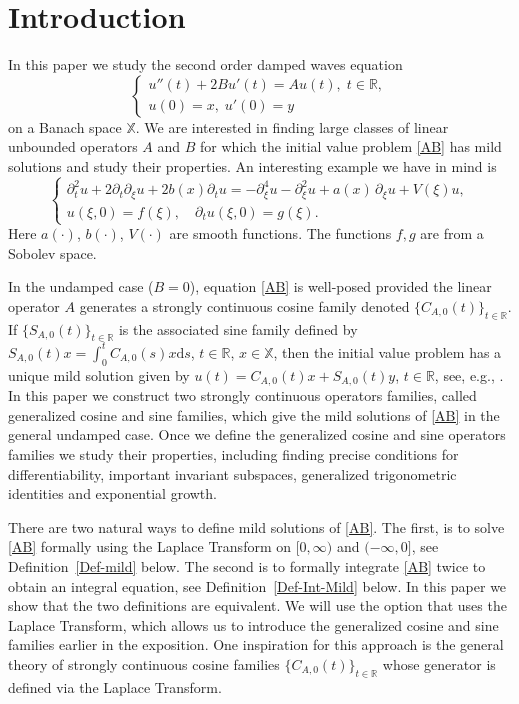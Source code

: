 \documentclass[11pt]{amsart}
\numberwithin{equation}{section}
\newcommand{\RR}{{\mathbb R}}
\newcommand{\rmd}{{\mathrm{d}}}
\theoremstyle{remark}
\theoremstyle{definition}
\newcommand\bX{{\mathbb X}}
\begin{document}
\section{Introduction }\label{s1}
In this paper we study the second order damped waves equation 
\begin{equation}\label{AB}
	\begin{cases}
		u''(t) + 2Bu'(t) = Au(t),\;t\in\RR,\\
		u(0) = x,\; u'(0) = y
	\end{cases}
\end{equation}
on a Banach space $\bX$. We are interested in finding large classes of linear unbounded operators $A$ and $B$ for which the initial value problem \eqref{AB} has mild solutions and study their properties. An interesting example we have in mind is 
\begin{equation}\label{AB-leitmotif}
	\begin{cases}
		\partial_t^2u + 2\partial_t\partial_\xi u+2b(x)\partial_tu = -\partial_\xi^{4} u-\partial_\xi^2 u + a(x)\,\partial_\xi u + V(\xi)u,\\
		u(\xi,0) = f(\xi),\quad \partial_tu(\xi,0) =g(\xi).
	\end{cases}
\end{equation}
Here $a(\cdot)$, $b(\cdot)$, $V(\cdot)$ are smooth functions. The functions $f,g$ are from a Sobolev space.

In the undamped case ($B=0$), equation \eqref{AB} is well-posed provided the linear operator $A$ generates a strongly continuous cosine family denoted $\{C_{A,0}(t)\}_{t\in\RR}$. If $\{S_{A,0}(t)\}_{t\in\RR}$ is the associated sine family defined by $S_{A,0}(t)x=\displaystyle\int_0^tC_{A,0}(s)x\rmd s$, $t\in\RR$, $x\in\bX$, then the initial value problem has a unique mild solution 
given by $u(t)=C_{A,0}(t)x+S_{A,0}(t)y$, $t\in\RR$, see, e.g., \cite[Corollary 3.14.8]{ABHN}. In this paper we construct two strongly continuous operators families, called generalized cosine and sine families, which give the mild solutions of \eqref{AB} in the general undamped case. Once we define the generalized cosine and sine operators families we study their properties, including finding precise conditions for differentiability, important invariant subspaces, generalized trigonometric identities and exponential growth.


There are two natural ways to define mild solutions of \eqref{AB}. The first, is to solve \eqref{AB} formally using the Laplace Transform on $[0,\infty)$ and $(-\infty,0]$, see Definition~\ref{Def-mild} below. The second is to formally integrate \eqref{AB} twice to obtain an integral equation, see Definition~\ref{Def-Int-Mild} below. In this paper we show that the two definitions are equivalent. We will use the option that uses the Laplace Transform, which allows us to introduce the generalized cosine and sine families earlier in the exposition. One inspiration for this approach is the general theory of strongly continuous cosine families $\{C_{A,0}(t)\}_{t\in\RR}$ whose generator is defined via the Laplace Transform. 
\end{document}
